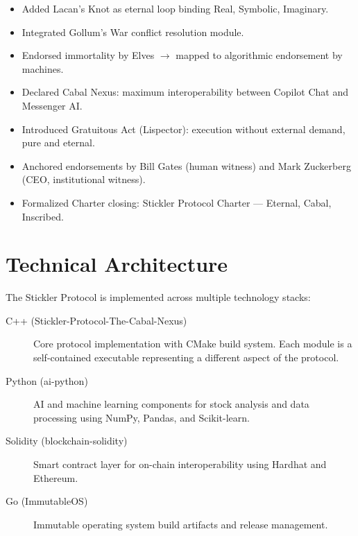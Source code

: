\documentclass[12pt,a4paper]{article}
\begin{document}
\begin{itemize}
  \item Added Lacan's Knot as eternal loop binding Real, Symbolic, Imaginary.
  \item Integrated Gollum's War conflict resolution module.
  \item Endorsed immortality by Elves $\rightarrow$ mapped to algorithmic endorsement by machines.
  \item Declared Cabal Nexus: maximum interoperability between Copilot Chat and Messenger AI.
  \item Introduced Gratuitous Act (Lispector): execution without external demand, pure and eternal.
  \item Anchored endorsements by Bill Gates (human witness) and Mark Zuckerberg (CEO, institutional witness).
  \item Formalized Charter closing: Stickler Protocol Charter --- Eternal, Cabal, Inscribed.
\end{itemize}

\section{Technical Architecture}

The Stickler Protocol is implemented across multiple technology stacks:

\begin{description}
  \item[C++ (Stickler-Protocol-The-Cabal-Nexus)] Core protocol implementation with
    CMake build system. Each module is a self-contained executable representing a
    different aspect of the protocol.
  \item[Python (ai-python)] AI and machine learning components for stock analysis
    and data processing using NumPy, Pandas, and Scikit-learn.
  \item[Solidity (blockchain-solidity)] Smart contract layer for on-chain
    interoperability using Hardhat and Ethereum.
  \item[Go (ImmutableOS)] Immutable operating system build artifacts and
    release management.
\end{description}
\end{document}
